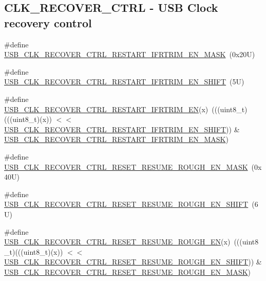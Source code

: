 \subsection*{C\+L\+K\+\_\+\+R\+E\+C\+O\+V\+E\+R\+\_\+\+C\+T\+RL -\/ U\+SB Clock recovery control}
\begin{DoxyCompactItemize}
\item 
\#define \mbox{\hyperlink{group___u_s_b___register___masks_ga77dc2ce9a51eff644d449abfa8228935}{U\+S\+B\+\_\+\+C\+L\+K\+\_\+\+R\+E\+C\+O\+V\+E\+R\+\_\+\+C\+T\+R\+L\+\_\+\+R\+E\+S\+T\+A\+R\+T\+\_\+\+I\+F\+R\+T\+R\+I\+M\+\_\+\+E\+N\+\_\+\+M\+A\+SK}}~(0x20\+U)
\item 
\#define \mbox{\hyperlink{group___u_s_b___register___masks_gafd08f3eb421e7db973f9940a2111f0a7}{U\+S\+B\+\_\+\+C\+L\+K\+\_\+\+R\+E\+C\+O\+V\+E\+R\+\_\+\+C\+T\+R\+L\+\_\+\+R\+E\+S\+T\+A\+R\+T\+\_\+\+I\+F\+R\+T\+R\+I\+M\+\_\+\+E\+N\+\_\+\+S\+H\+I\+FT}}~(5\+U)
\item 
\#define \mbox{\hyperlink{group___u_s_b___register___masks_gada4fdb1916b81069fbd064c0493cad58}{U\+S\+B\+\_\+\+C\+L\+K\+\_\+\+R\+E\+C\+O\+V\+E\+R\+\_\+\+C\+T\+R\+L\+\_\+\+R\+E\+S\+T\+A\+R\+T\+\_\+\+I\+F\+R\+T\+R\+I\+M\+\_\+\+EN}}(x)~(((uint8\+\_\+t)(((uint8\+\_\+t)(x)) $<$$<$ \mbox{\hyperlink{group___u_s_b___register___masks_gafd08f3eb421e7db973f9940a2111f0a7}{U\+S\+B\+\_\+\+C\+L\+K\+\_\+\+R\+E\+C\+O\+V\+E\+R\+\_\+\+C\+T\+R\+L\+\_\+\+R\+E\+S\+T\+A\+R\+T\+\_\+\+I\+F\+R\+T\+R\+I\+M\+\_\+\+E\+N\+\_\+\+S\+H\+I\+FT}})) \& \mbox{\hyperlink{group___u_s_b___register___masks_ga77dc2ce9a51eff644d449abfa8228935}{U\+S\+B\+\_\+\+C\+L\+K\+\_\+\+R\+E\+C\+O\+V\+E\+R\+\_\+\+C\+T\+R\+L\+\_\+\+R\+E\+S\+T\+A\+R\+T\+\_\+\+I\+F\+R\+T\+R\+I\+M\+\_\+\+E\+N\+\_\+\+M\+A\+SK}})
\item 
\#define \mbox{\hyperlink{group___u_s_b___register___masks_gae30340de1a58627aeb4aac99ba1b0418}{U\+S\+B\+\_\+\+C\+L\+K\+\_\+\+R\+E\+C\+O\+V\+E\+R\+\_\+\+C\+T\+R\+L\+\_\+\+R\+E\+S\+E\+T\+\_\+\+R\+E\+S\+U\+M\+E\+\_\+\+R\+O\+U\+G\+H\+\_\+\+E\+N\+\_\+\+M\+A\+SK}}~(0x40\+U)
\item 
\#define \mbox{\hyperlink{group___u_s_b___register___masks_ga30a7d01d4ba637c538f8dc499436b81e}{U\+S\+B\+\_\+\+C\+L\+K\+\_\+\+R\+E\+C\+O\+V\+E\+R\+\_\+\+C\+T\+R\+L\+\_\+\+R\+E\+S\+E\+T\+\_\+\+R\+E\+S\+U\+M\+E\+\_\+\+R\+O\+U\+G\+H\+\_\+\+E\+N\+\_\+\+S\+H\+I\+FT}}~(6\+U)
\item 
\#define \mbox{\hyperlink{group___u_s_b___register___masks_ga8d125bb7030c1076bfeee0699b4ef507}{U\+S\+B\+\_\+\+C\+L\+K\+\_\+\+R\+E\+C\+O\+V\+E\+R\+\_\+\+C\+T\+R\+L\+\_\+\+R\+E\+S\+E\+T\+\_\+\+R\+E\+S\+U\+M\+E\+\_\+\+R\+O\+U\+G\+H\+\_\+\+EN}}(x)~(((uint8\+\_\+t)(((uint8\+\_\+t)(x)) $<$$<$ \mbox{\hyperlink{group___u_s_b___register___masks_ga30a7d01d4ba637c538f8dc499436b81e}{U\+S\+B\+\_\+\+C\+L\+K\+\_\+\+R\+E\+C\+O\+V\+E\+R\+\_\+\+C\+T\+R\+L\+\_\+\+R\+E\+S\+E\+T\+\_\+\+R\+E\+S\+U\+M\+E\+\_\+\+R\+O\+U\+G\+H\+\_\+\+E\+N\+\_\+\+S\+H\+I\+FT}})) \& \mbox{\hyperlink{group___u_s_b___register___masks_gae30340de1a58627aeb4aac99ba1b0418}{U\+S\+B\+\_\+\+C\+L\+K\+\_\+\+R\+E\+C\+O\+V\+E\+R\+\_\+\+C\+T\+R\+L\+\_\+\+R\+E\+S\+E\+T\+\_\+\+R\+E\+S\+U\+M\+E\+\_\+\+R\+O\+U\+G\+H\+\_\+\+E\+N\+\_\+\+M\+A\+SK}})

\end{DoxyCompactItemize}
